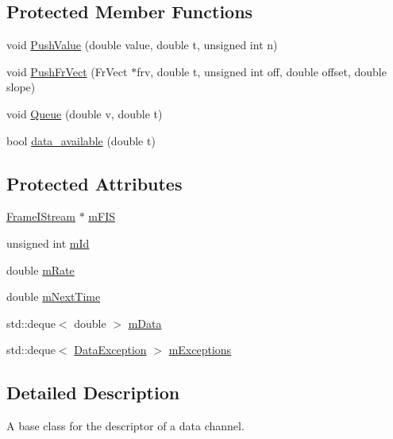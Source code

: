 \subsection*{Protected Member Functions}
\begin{DoxyCompactItemize}
\item 
void \hyperlink{classtsa_1_1_channel_descriptor_ae3da8cb574d6a43bcca33daca5394530}{Push\+Value} (double value, double t, unsigned int n)
\item 
void \hyperlink{classtsa_1_1_channel_descriptor_a61cb9c3f50762989afc59c9e365f0927}{Push\+Fr\+Vect} (Fr\+Vect $\ast$frv, double t, unsigned int off, double offset, double slope)
\item 
void \hyperlink{classtsa_1_1_channel_descriptor_ae38a3b6ca5d23123a61a421fe3612b86}{Queue} (double v, double t)
\item 
bool \hyperlink{classtsa_1_1_channel_descriptor_a73d060e190a75faa7ac64ee4a328a9d4}{data\+\_\+available} (double t)
\end{DoxyCompactItemize}
\subsection*{Protected Attributes}
\begin{DoxyCompactItemize}
\item 
\hyperlink{classtsa_1_1_frame_i_stream}{Frame\+I\+Stream} $\ast$ \hyperlink{classtsa_1_1_channel_descriptor_a7767947e90a66d41bbd13bd4c54149a6}{m\+F\+IS}
\item 
unsigned int \hyperlink{classtsa_1_1_channel_descriptor_a49d1e3852cb22b0a56ebc03b3176c5b8}{m\+Id}
\item 
double \hyperlink{classtsa_1_1_channel_descriptor_a142c7f60e14fa8036340b902529cf956}{m\+Rate}
\item 
double \hyperlink{classtsa_1_1_channel_descriptor_a6bad409238df7dff8b5265570adac8ff}{m\+Next\+Time}
\item 
std\+::deque$<$ double $>$ \hyperlink{classtsa_1_1_channel_descriptor_ad1568c18971efe9a5cb1d114e06f5050}{m\+Data}
\item 
std\+::deque$<$ \hyperlink{structtsa_1_1_data_exception}{Data\+Exception} $>$ \hyperlink{classtsa_1_1_channel_descriptor_ac4103a2793b7e507f8f982070ee27348}{m\+Exceptions}
\end{DoxyCompactItemize}


\subsection{Detailed Description}
A base class for the descriptor of a data channel. 

